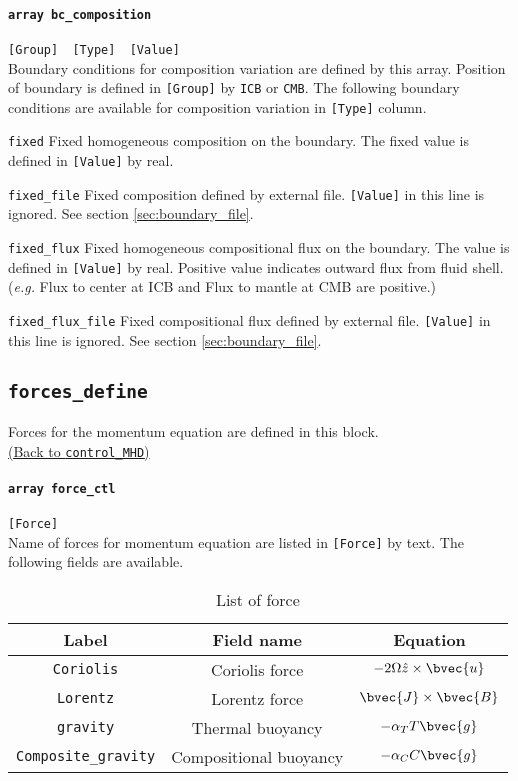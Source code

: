 \paragraph{\tt array bc\_composition}
\label{href_t:bc_composition}
\verb|[Group]  [Type]  [Value]| \\
Boundary conditions for composition variation are defined by this array. Position of boundary is defined in \verb|[Group]| by {\tt ICB} or {\tt CMB}. The following boundary conditions are available for composition variation in \verb|[Type]| column.
%
\begin{description}
\item{\tt fixed}			Fixed homogeneous composition on the boundary. The fixed value is defined in \verb|[Value]| by real.
\item{\tt fixed\_file}			Fixed composition defined by external file. \verb|[Value]| in this line is ignored. See section \ref{sec:boundary_file}.
\item{\tt fixed\_flux}	Fixed homogeneous compositional flux on the boundary. The value is defined in \verb|[Value]| by real. Positive value indicates outward flux from fluid shell. ({\it e.g.} Flux to center at ICB and Flux to mantle at CMB are positive.)
\item{\tt fixed\_flux\_file}			Fixed compositional flux defined by external file. \verb|[Value]| in this line is ignored. See section \ref{sec:boundary_file}.
\end{description}
%

\subsection{\tt forces\_define}
\label{href_t:forces_define}
Forces for the momentum equation are defined in this block. \\
\hyperref[href_i:forces_define]{(Back to {\tt control\_MHD})}

\paragraph{\tt array force\_ctl}
\label{href_t:force_ctl}
\verb|[Force]| \\
Name of forces for momentum equation are listed in \verb|[Force]| by text.
The following fields are available.
%
\begin{table}[htp]
\caption{List of force}
\begin{center}
\begin{tabular}{|c|c|c|}
\hline
 Label & Field name & Equation \\ \hline
\verb|Coriolis| & Coriolis force & $-2\Omega \hat{z} \times \bvec{u} $ \\
\verb|Lorentz| & Lorentz force &  $\bvec{J} \times \bvec{B} $ \\
\verb|gravity| & Thermal buoyancy & $-\alpha_{T} T \bvec{g}$ \\
\verb|Composite_gravity| & Compositional buoyancy  & $-\alpha_{C} C \bvec{g}$\\ \hline
\end{tabular}
\end{center}
\label{table:forces}
\end{table}
%

